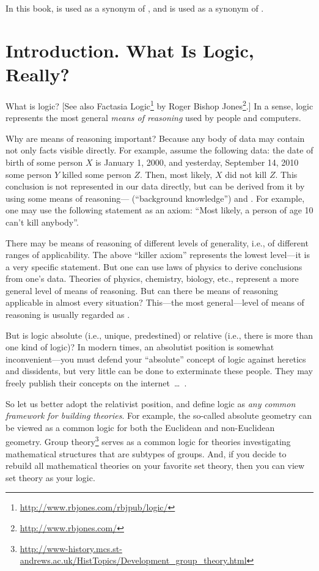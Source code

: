 \begin{note}
In this book,  is used as a synonym of , and  is used as a synonym of .
\end{note}

\section{Introduction. What Is Logic, Really?}

What is logic?
[See also Factasia Logic\footnote{\url{http://www.rbjones.com/rbjpub/logic/}} by Roger Bishop Jones\footnote{\url{http://www.rbjones.com/}}.]
In a sense, logic represents the most general \emph{means of reasoning} used by people and computers.

Why are means of reasoning important?
Because any body of data may contain not only facts visible directly.
For example, assume the following data: the date of birth of some person \(X\) is January 1, 2000,
and yesterday, September 14, 2010 some person \(Y\) killed some person \(Z\).
Then, most likely, \(X\) did not kill \(Z\).
This conclusion is not represented in our data directly, but can be derived from it by using some means of reasoning--- (``background knowledge'') and .
For example, one may use the following statement as an axiom: ``Most likely, a person of age 10 can't kill anybody''.

There may be means of reasoning of different levels of generality, i.e., of different ranges of applicability.
The above ``killer axiom'' represents the lowest level---it is a very specific statement.
But one can use laws of physics to derive conclusions from one's data.
Theories of physics, chemistry, biology, etc., represent a more general level of means of reasoning.
But can there be means of reasoning applicable in almost every situation?
This---the most general---level of means of reasoning is usually regarded as .

But is logic absolute (i.e., unique, predestined) or relative (i.e., there is more than one kind of logic)?
In modern times, an absolutist position is somewhat inconvenient---you must defend your ``absolute'' concept of logic against heretics and dissidents, but very little can be done to exterminate these people.
They may freely publish their concepts on the internet~\ldots~.

So let us better adopt the relativist position, and define logic as \emph{any common framework for building theories}.
For example, the so-called absolute geometry can be viewed as a common logic for both the Euclidean and non-Euclidean geometry.
Group theory\footnote{\url{http://www-history.mcs.st-andrews.ac.uk/HistTopics/Development\_group\_theory.html}} serves as a common logic for theories investigating mathematical structures that are subtypes of groups.
And, if you decide to rebuild all mathematical theories on your favorite set theory, then you can view set theory as your logic.

